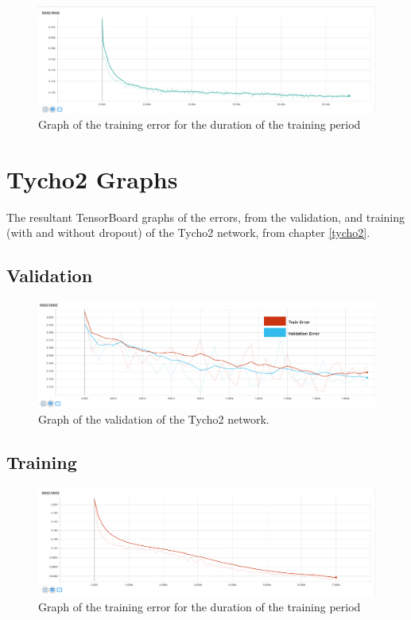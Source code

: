 \documentclass[12pt,a4paper,oneside,oldfontcommands]{memoir}
\begin{document}
\begin{Declaration Of OriginalityOrginality}
\begin{figure}[H]
  \centering
    \includegraphics[width=\linewidth]{graphs/C/tycho_12_TRAIN_SELECT_ONE_ADAM_0004_relu.png}
    \caption{Graph of the training error for the duration of the training period}
\end{figure}

\chapter{Tycho2 Graphs}

The resultant TensorBoard graphs of the errors, from the validation, and training (with and without dropout) of the Tycho2 network, from chapter \ref{tycho2}.


\section{Validation}

\begin{figure}[H]
  \centering
    \includegraphics[width=\linewidth]{graphs/D/tycho_2_experiments_ADAM_00004_relu_relu.png}
    \caption{Graph of the validation of the Tycho2 network.}
\end{figure}

\section{Training}
 

\begin{figure}[H]
  \centering
    \includegraphics[width=\linewidth]{graphs/D/tycho_2_TRAIN_CONCAT_ADAM_0004_relu_relu_0.png}
    \caption{Graph of the training error for the duration of the training period}
\end{figure}


\end{Declaration Of OriginalityOrginality}
\end{document}
